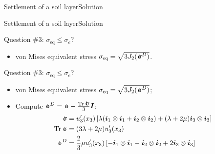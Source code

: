 \documentclass{beamer}
\newcommand{\trace}{\operatorname{Tr}}
\newcommand{\Id}{{\boldsymbol I}}
\newcommand{\uj}{u}
\newcommand{\xj}{x}
\renewcommand{\ij}{i}
\newcommand{\iv}{{\boldsymbol\ij}}
\newcommand*{\stressj}{\sigma}
\newcommand{\stress}{\mbox{$\hspace{0.3em}\rotatebox[x=0pt,y=0.2pt]{90}{\rule{0.017\linewidth}{0.4pt}}\hspace{-0.25em}\upsigma$}}
\begin{document}
\begin{frame}{Settlement of a soil layer}{Solution}
\begin{overprint}
\end{overprint}

\end{frame}

\begin{frame}{Settlement of a soil layer}{Solution}

\begin{overprint}

\vskip-20pt
\begin{exampleblock}{Question \#3: $\stressj_\text{eq}\leq\stressj_e$?}
\begin{itemize}
\item von Mises equivalent stress $\stressj_\text{eq}=\sqrt{3J_2(\stress^D)}$.
\end{itemize}
\end{exampleblock}

\vskip-20pt
\begin{exampleblock}{Question \#3: $\stressj_\text{eq}\leq\stressj_e$?}
\begin{itemize}
\item von Mises equivalent stress $\stressj_\text{eq}=\sqrt{3J_2(\stress^D)}$;
\item Compute $\smash{\stress^D}=\smash{\stress-\frac{\trace\stress}{3}}\Id$:
\begin{displaymath}
\begin{split}
\stress &= \uj_3'(\xj_3)\left[\lambda(\iv_1\otimes\iv_1+\iv_2\otimes\iv_2)+(\lambda+2\mu)\iv_3\otimes\iv_3\right] \\
\trace\stress &=(3\lambda+2\mu)\uj_3'(\xj_3) \\
\stress^D &=\frac{2}{3}\mu\uj_3'(\xj_3)\left[-\iv_1\otimes\iv_1-\iv_2\otimes\iv_2+2\iv_3\otimes\iv_3\right]
\end{split}
\end{displaymath}
\end{itemize}
\end{exampleblock}


\end{overprint}
\end{frame}
\end{document}
